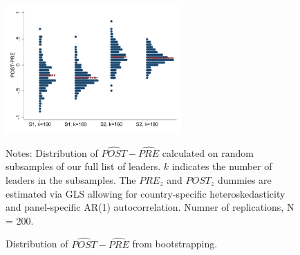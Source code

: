 \begin{figure}[h]
	\centering
	\includegraphics[width=0.6\textwidth]{Figures/bootstrapping.pdf}
	\caption{Distribution of $\widehat{POST}-\widehat{PRE}$ from bootstrapping.}\label{fig:boot}
	\medskip %
	\begin{minipage}{0.9\textwidth} %
		{\footnotesize Notes: Distribution of $\widehat{POST}-\widehat{PRE}$ calculated on random subsamples of our full list of leaders. $k$ indicates the number of leaders in the subsamples. The $PRE_z$ and $POST_z$ dummies are estimated via GLS allowing for country-specific heteroskedasticity and panel-specific AR(1) autocorrelation. Numner of replications, N = 200.\par}
	\end{minipage}
\end{figure}
